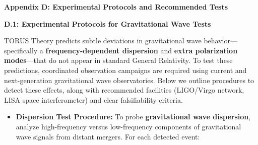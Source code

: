 \documentclass[]{article}
\date{}
\begin{document}
\textbf{Appendix D: Experimental Protocols and Recommended Tests}

\textbf{D.1: Experimental Protocols for Gravitational Wave Tests}

TORUS Theory predicts subtle deviations in gravitational wave
behavior---specifically a \textbf{frequency-dependent dispersion} and
\textbf{extra polarization modes}---that do not appear in standard
General Relativity. To test these predictions, coordinated observation
campaigns are required using current and next-generation gravitational
wave observatories. Below we outline procedures to detect these effects,
along with recommended facilities (LIGO/Virgo network, LISA space
interferometer) and clear falsifiability criteria.

\begin{itemize}
\item
  \textbf{Dispersion Test Procedure:} To probe \textbf{gravitational
  wave dispersion}, analyze high-frequency versus low-frequency
  components of gravitational wave signals from distant mergers. For
  each detected event:


\end{itemize}
\end{document}
